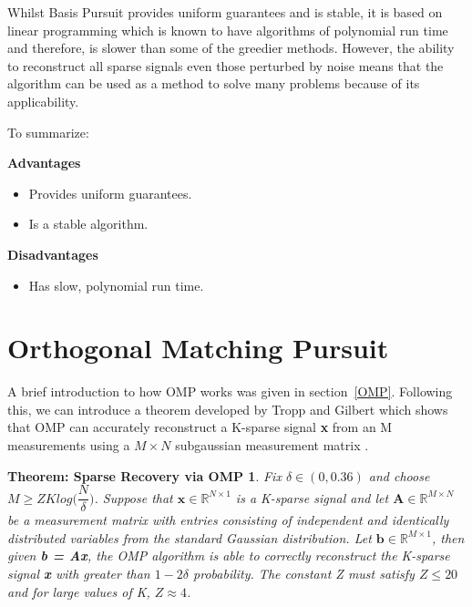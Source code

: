 \documentclass[titlepage,oneside, 12pt]{book}
\theoremstyle{break}
\begin{document}
Whilst Basis Pursuit provides uniform guarantees and is stable, it is based on linear programming which is known to have algorithms of polynomial run time and therefore, is slower than some of the greedier methods. 
However, the ability to reconstruct all sparse signals even those perturbed by noise means that the algorithm can be used as a method to solve many problems because of its applicability. 

\begin{flushleft}
To summarize:
\end{flushleft}

\textbf{Advantages}
\begin{itemize}
\item Provides uniform guarantees.
\item Is a stable algorithm.
\end{itemize}

\textbf{Disadvantages}
\begin{itemize}
\item Has slow, polynomial run time.
\end{itemize}

\newpage

\section{Orthogonal Matching Pursuit}
A brief introduction to how OMP works was given in section~\ref{OMP}. Following this, we can introduce a theorem developed by Tropp and Gilbert\cite{GP-Orthog} which shows that OMP can accurately reconstruct a K-sparse signal \textbf{x} from an M  measurements using a $M \times N$ subgaussian measurement matrix . 

\newtheorem*{SROMP}{Theorem: Sparse Recovery via OMP\cite{GP-Orthog}}\label{SROMPTH}
\begin{SROMP}
Fix $\delta \in (0,0.36)$ and choose $M \geq ZKlog\bigg(\dfrac{N}{\delta}\bigg)$. Suppose that $\textbf{x} \in \mathbb{R}^{N \times 1}$ is a K-sparse signal and let $\textbf{A} \in \mathbb{R}^{M \times N}$ be a measurement matrix with entries consisting of independent and identically distributed variables from the standard Gaussian distribution. Let $\textbf{b} \in \mathbb{R}^{M \times 1}$, then given \textbf{b = Ax}, the OMP algorithm is able to correctly reconstruct the K-sparse signal \textbf{x} with greater than $1 - 2\delta$ probability. The constant Z must satisfy $Z \leq 20$ and for large values of K, $Z \approx 4$. 

\end{SROMP}
\end{document}
